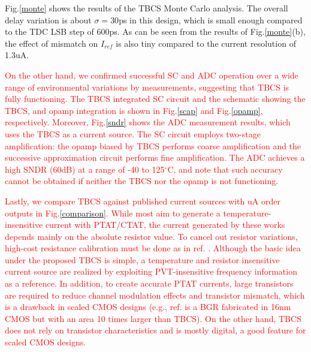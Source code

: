 \documentclass[paper]{ieice}
\begin{document}
Fig.\ref{monte} shows the results of the TBCS Monte Carlo analysis. The overall delay variation is about $\sigma= 30$ps in this design, which is small enough compared to the TDC LSB step of 600ps. As can be seen from the results of Fig.\ref{monte}(b), the effect of mismatch on $I_{ref}$ is also tiny compared to the current resolution of 1.3uA. %

\textcolor{red}{
On the other hand, we confirmed successful SC and ADC operation over a wide range of environmental variations by measurements, suggesting that TBCS is fully functioning. %
The TBCS integrated SC circuit and the schematic showing the TBCS, and opamp integration is shown in Fig.\ref{scap} and Fig.\ref{opamp}, respectively. Moreover, Fig.\ref{sndr} shows the ADC measurement results, which uses the TBCS as a current source. The SC circuit employs two-stage amplification: the opamp biased by TBCS performs coarse amplification and the successive approximation circuit performs fine amplification. The ADC achieves a high SNDR (60dB) at a range of -40 to 125$^\circ$C, and note that such accuracy cannot be obtained if neither the TBCS nor the opamp is not functioning. }

\textcolor{red}{Lastly, we compare TBCS against published current sources with uA order outputs in Fig.\ref{comparison}. While most aim to generate a temperature-insensitive current with PTAT/CTAT, the current generated by these works depends mainly on the absolute resistor value. To cancel out resistor variations, high-cost resistance calibration must be done as in ref. \cite{osipov2016temperature}. Although the basic idea under the proposed TBCS is simple, a temperature and resistor insensitive current source are realized by exploiting PVT-insensitive frequency information as a reference. In addition, to create accurate PTAT currents, large transistors are required to reduce channel modulation effects and transistor mismatch, which is a drawback in scaled CMOS designs (e.g., ref. \cite{wadhwa2017high} is a BGR fabricated in 16nm CMOS but with an area 10 times larger than TBCS). On the other hand, TBCS does not rely on transistor characteristics and is mostly digital, a good feature for scaled CMOS designs.}
\end{document}
